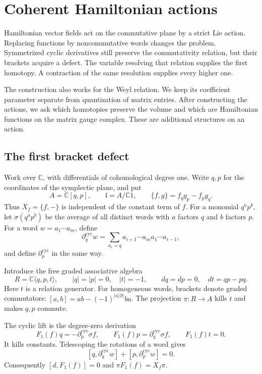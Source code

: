 \chapter{Coherent Hamiltonian actions}
\label{mht:ch:coherent-actions}

Hamiltonian vector fields act on the commutative plane by a strict
Lie action. Replacing functions by noncommutative words changes the
problem. Symmetrized cyclic derivatives still preserve the
commutativity relation, but their brackets acquire a defect.
The variable resolving that relation supplies the first homotopy.
A contraction of the same resolution supplies every higher one.

The construction also works for the Weyl relation. We keep its
coefficient parameter separate from quantization of matrix entries.
After constructing the actions, we ask which homotopies preserve
the volume and which are Hamiltonian functions on the matrix
gauge complex. These are additional structures on an action.

\section{The first bracket defect}

Work over $\mathbb C$, with differentials of cohomological degree
one. Write $q,p$ for the coordinates of the symplectic plane, and put
\[
 A=\mathbb C[q,p],\qquad
 \mathfrak l=A/\mathbb C1,\qquad
 \{f,g\}=f_qg_p-f_pg_q.
\]
Thus $X_f=\{f,-\}$ is independent of the constant term of $f$.
For a monomial $q^ap^b$, let $\sigma(q^ap^b)$ be the average of
all distinct words with $a$ factors $q$ and $b$ factors $p$.
For a word $w=a_1\cdots a_m$, define
\[
 \partial_q^{\mathrm{cyc}}w
 =\sum_{a_i=q}a_{i+1}\cdots a_ma_1\cdots a_{i-1},
\]
and define $\partial_p^{\mathrm{cyc}}$ in the same way.

Introduce the free graded associative algebra
\begin{equation}\label{mht:eq:relation-resolution}
 R=\mathbb C\langle q,p,t\rangle,
 \qquad |q|=|p|=0,\quad |t|=-1,
 \qquad dq=dp=0,\quad dt=qp-pq.
\end{equation}
Here $t$ is a relation generator. For homogeneous words, brackets
denote graded commutators:
$[a,b]=ab-(-1)^{|a||b|}ba$. The projection $\pi:R\to A$ kills
$t$ and makes $q,p$ commute.

The cyclic lift is the degree-zero derivation
\begin{equation}\label{mht:eq:cyclic-first-action}
 F_1(f)q=-\partial_p^{\mathrm{cyc}}\sigma f,
 \qquad F_1(f)p=\partial_q^{\mathrm{cyc}}\sigma f,
 \qquad F_1(f)t=0.
\end{equation}
It kills constants. Telescoping the rotations of a word gives
\[
 [q,\partial_q^{\mathrm{cyc}}w]
 +[p,\partial_p^{\mathrm{cyc}}w]=0.
\]
Consequently $[d,F_1(f)]=0$ and $\pi F_1(f)=X_f\pi$.

